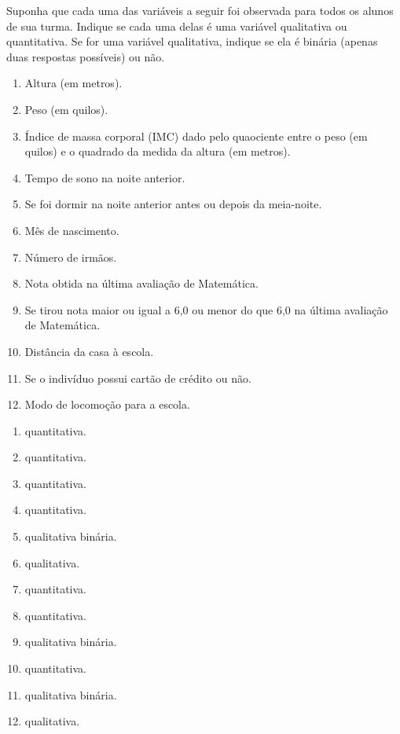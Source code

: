 \documentclass[10 pt,usenames,dvipsnames, oneside]{article}
\begin{document}
Suponha que cada uma das variáveis a seguir foi observada para todos os alunos de sua turma. Indique se cada uma delas é uma variável qualitativa ou quantitativa. Se for uma variável qualitativa, indique se ela é binária (apenas duas respostas possíveis) ou não.
\begin{enumerate}
\item {} 
Altura (em metros).

\item {} 
Peso (em quilos).

\item {} 
Índice de massa corporal (IMC) dado pelo quaociente entre o peso (em quilos) e o quadrado da medida da altura (em metros).

\item {} 
Tempo de sono na noite anterior.

\item {} 
Se foi dormir na noite anterior antes ou depois da meia-noite.

\item {} 
Mês de nascimento.

\item {} 
Número de irmãos.

\item {} 
Nota obtida na última avaliação de Matemática.

\item {} 
Se tirou nota maior ou igual a 6,0 ou menor do que 6,0 na última avaliação de Matemática.

\item {} 
Distância da casa à escola.

\item {} 
Se o indivíduo possui cartão de crédito ou não.

\item {} 
Modo de locomoção para a escola.

\end{enumerate}


\ifdefined\prof
\begin{solucao}
\begin{enumerate}
\item quantitativa.
\item quantitativa.
\item quantitativa.
\item quantitativa. 
\item qualitativa binária.
\item qualitativa.
\item quantitativa. 
\item quantitativa.
\item qualitativa binária.
\item quantitativa.
\item qualitativa binária.
\item qualitativa.
\end{enumerate}
\end{solucao}
\fi
\end{document}
